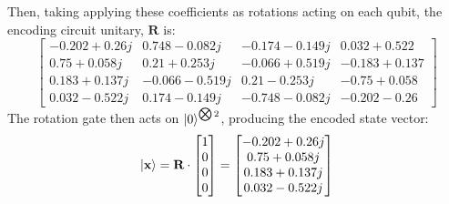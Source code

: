 Then, taking applying these coefficients as rotations acting on each qubit, the encoding circuit unitary, $\textbf{R}$ is:
\begin{equation}
    \begin{bmatrix}
    -0.202+0.26j &  0.748-0.082j & -0.174-0.149j & 0.032+0.522 \\
    0.75 +0.058j &  0.21 +0.253j & -0.066+0.519j & -0.183+0.137 \\
    0.183+0.137j & -0.066-0.519j &  0.21 -0.253j & -0.75 +0.058 \\
    0.032-0.522j &  0.174-0.149j & -0.748-0.082j & -0.202-0.26 
    \end{bmatrix}
\end{equation}
% 
The rotation gate then acts on $\left\vert{0}\right\rangle^{\bigotimes 2}$, producing the encoded state vector:
\begin{equation}
    \left\vert{\textbf{x}}\right\rangle
    =
    \textbf{R} \cdot
    \begin{bmatrix}
        1 \\ 0 \\ 0 \\ 0
    \end{bmatrix}
    =
    \begin{bmatrix}
        -0.202+0.26j \\
        0.75 +0.058j \\
        0.183+0.137j \\
        0.032-0.522j
    \end{bmatrix}
\end{equation}


